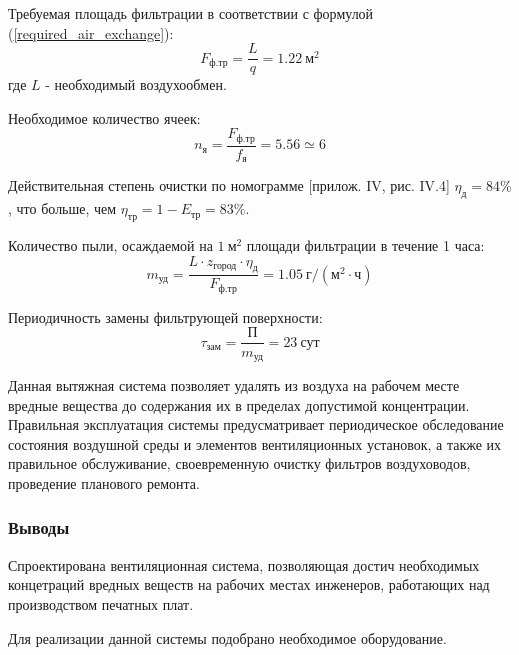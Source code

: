 Требуемая площадь фильтрации в соответствии с формулой (\ref{required_air_exchange}):
$$
    F_\text{ф.тр} = \frac{L}{q} = 1.22 ~\text{м}^2
$$
где $L$ - необходимый воздухообмен.

Необходимое количество ячеек:
$$
    n_\text{я} =    \frac{F_\text{ф.тр}}{f_\text{я}} = 5.56
                    \simeq 6
$$

Действительная степень очистки по номограмме
\cite{air_ventilation_and_conditioning}[прилож. IV, рис. IV.4] $\eta_\text{д} = 84 \%$, что
больше, чем $\eta_\text{тр} = 1 - E_\text{тр} = 83 \%$.

Количество пыли, осаждаемой на $1 ~\text{м}^2$ площади фильтрации в течение 1 часа:
$$
    m_\text{уд} = \frac{L \cdot z_\text{город} \cdot \eta_\text{д}}{F_\text{ф.тр}}
            = 1.05 ~\text{г/}(\text{м}^2 \cdot \text{ч})
$$

Периодичность замены фильтрующей поверхности:
$$
    \tau_\text{зам} = \frac{\text{П}}{m_\text{уд}} = 23 ~\text{сут}
$$

Данная вытяжная система позволяет удалять из воздуха на рабочем месте вредные
вещества до содержания их в пределах допустимой концентрации. Правильная эксплуатация
системы предусматривает периодическое обследование состояния воздушной среды и
элементов вентиляционных установок, а также их правильное обслуживание, своевременную
очистку фильтров воздуховодов, проведение планового ремонта.

\subsubsection{Выводы}

Спроектирована вентиляционная система, позволяющая достич необходимых концетраций
вредных веществ на рабочих местах инженеров, работающих над производством печатных плат.

Для реализации данной системы подобрано необходимое оборудование.
